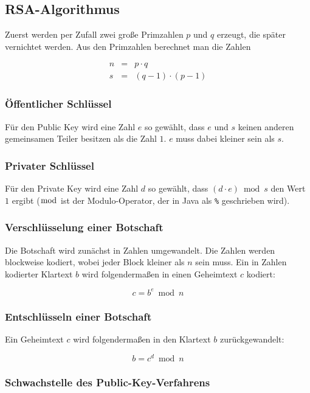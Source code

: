 \subsection{RSA-Algorithmus}

Zuerst werden per Zufall zwei große Primzahlen $p$ und $q$ erzeugt, die später
vernichtet werden. Aus den Primzahlen berechnet man die Zahlen

\begin{eqnarray*}
n &=& p \cdot q\\
s &=& (q - 1) \cdot (p - 1)
\end{eqnarray*}

\subsubsection{Öffentlicher Schlüssel}

Für den Public Key wird eine Zahl $e$ so gewählt, dass $e$ und $s$ keinen
anderen gemeinsamen Teiler besitzen als die Zahl $1$. $e$ muss dabei kleiner
sein als $s$.

\subsubsection{Privater Schlüssel}

Für den Private Key wird eine Zahl $d$ so gewählt, dass $(d \cdot e) \bmod s$
den Wert $1$ ergibt ($\bmod$ ist der Modulo-Operator, der in Java als
\lstinline|%| geschrieben wird).

\subsubsection{Verschlüsselung einer Botschaft}

Die Botschaft wird zunächst in Zahlen umgewandelt. Die Zahlen werden blockweise
kodiert, wobei jeder Block kleiner als $n$ sein muss. Ein in Zahlen kodierter
Klartext $b$ wird folgendermaßen in einen Geheimtext $c$ kodiert:

\[
c = b^e \bmod n
\]

\subsubsection{Entschlüsseln einer Botschaft}

Ein Geheimtext $c$ wird folgendermaßen in den Klartext $b$ zurückgewandelt:

\[
b = c^d \bmod n
\] 

\subsubsection{Schwachstelle des Public-Key-Verfahrens}
	
